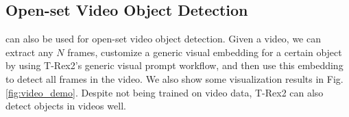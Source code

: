 \begin{table}[]
  \centering
\caption{Zero-shot region classification results. For each dataset, we use its full categories as the classification target and calculate the Top1 and Top5 classification accuracy. For CLIP, we crop the region out for classification.}
\label{tab:region_classification}
\end{table}


\subsection{Open-set Video Object Detection}
\ourmodel{} can also be used for open-set video object detection. Given a video, we can extract any $N$ frames, customize a generic visual embedding for a certain object by using T-Rex2's generic visual prompt workflow, and then use this embedding to detect all frames in the video. We also show some visualization results in Fig. \ref{fig:video_demo}. Despite not being trained on video data, T-Rex2 can also detect objects in videos well. 

